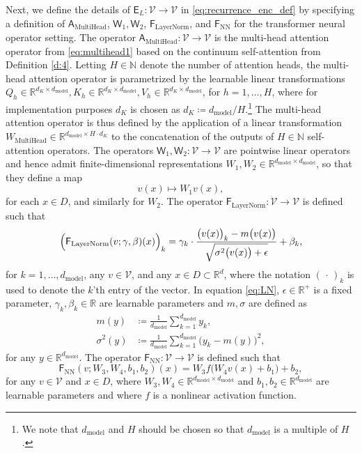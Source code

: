 \documentclass[twoside]{article}
\newcommand{\1}{\mathbbm{1}}
\newcommand{\R}{\mathbbm{R}}
\newcommand{\N}{\mathbbm{N}}
\newcommand{\cV}{\mathcal{V}}
\newcommand{\sA}{\mathsf{A}}
\newcommand{\sF}{\mathsf{F}}
\newcommand{\sE}{\mathsf{E}}
\newcommand{\sW}{\mathsf{W}}
\providecommand{\mathbbm}{\mathbb} %
\begin{document}
Next, we define the details of $\sE_L: \cV \to \cV$ in \eqref{eq:recurrence_enc_def} by specifying a definition of $\sA_\textrm{MultiHead}$, $\sW_1,\sW_2$, $\sF_\textrm{LayerNorm}$, and $\sF_{\textrm{NN}}$ for the transformer neural operator setting. The operator $\sA_{\textrm{MultiHead}}: \cV \to \cV$ is the multi-head attention operator from \eqref{eq:multihead1} based on the continuum self-attention from Definition \ref{d:4}. Letting $H\in \N$ denote the number of attention heads, the multi-head attention operator is parametrized by the learnable linear transformations $Q_h\in \R^{d_K\times d_{\textrm{model}}},K_h\in \R^{d_K\times d_{\textrm{model}}},V_h\in \R^{d_K\times d_{\textrm{model}}}$, for $h=1,\ldots,H$, where for implementation purposes $d_K$ is chosen as $d_K\coloneqq d_{\textrm{model}}/H$.\footnote{We note that $d_{\textrm{model}}$ and $H$ should be chosen so that $d_{\textrm{model}}$ is a multiple of $H$.} 
The multi-head attention operator is thus defined by the application of a linear transformation $W_{\textrm{MultiHead}}\in \R^{d_{\textrm{model}}\times H\cdot d_K}$ to the concatenation of the outputs of $H\in\N$ self-attention operators. The operators $\sW_1,\sW_2:\cV\to\cV$ are pointwise linear operators and hence admit finite-dimensional representations $W_1,W_2\in \R^{d_{\textrm{model}}\times d_{\textrm{model}}}$, so that they define a map
\[
v(x)\mapsto W_1v(x),
\]
for each $x\in D$, and similarly for $W_2$. The operator $\sF_{\textrm{LayerNorm}}: \cV \to \cV$ is defined such that
\begin{equation}
\label{eq:LN}
\Bigl(\sF_{\textrm{LayerNorm}}({v};\gamma,\beta)(x)\Bigr)_k = \gamma_k\cdot\frac{\bigl(v(x)\bigr)_k - m\bigl(v(x)\bigr)}{\sqrt{\sigma^2\bigl(v(x)\bigr)+\epsilon}} +\beta_k,
\end{equation}
for $k=1,\dots,d_{\textrm{model}}$, any $v \in \cV$, and any $x \in D \subset \R^{d}$, where the notation $(\,\cdot\,)_k$ is used to denote the $k$'th entry of the vector. In equation \eqref{eq:LN}, $\epsilon\in\R^+$ is a fixed parameter, $\gamma_k,\beta_k\in\R$ are learnable parameters and $m,\sigma$ are defined as
\begin{equation}
\label{eq:LN_meanvar}
\begin{aligned}
    m(y) &\coloneqq \frac1{d_{\textrm{model}}}\sum_{k=1}^{d_{\textrm{model}}}y_k,\\
    \sigma^2(y) &\coloneqq \frac1{d_{\textrm{model}}}\sum_{k=1}^{d_{\textrm{model}}}\bigl(y_k-m(y) \bigr)^2 ,
\end{aligned}
\end{equation}
for any $y\in \R^{d_{\textrm{model}}}.$ 
The operator $\sF_\textrm{NN}: \cV \to \cV$ is defined such that
\begin{equation}
\label{eq:NN}
    \sF_\textrm{NN}(v;W_3,W_4,b_1,b_2)(x) = W_3f\bigl(W_4v(x)+b_1\bigr) + b_2,
\end{equation}
for any $v \in \cV$ and $x\in D$, where $W_3,W_4\in\R^{d_\textrm{model}\times d_\textrm{model}}$ and $b_1,b_2 \in \R^{d_\textrm{model}}$ are learnable parameters and where $f$ is a nonlinear activation function. 
\end{document}
